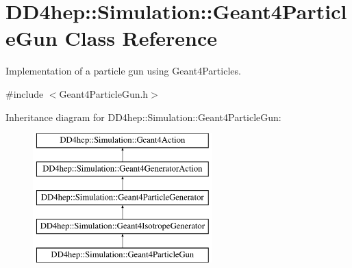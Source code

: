 \hypertarget{class_d_d4hep_1_1_simulation_1_1_geant4_particle_gun}{}\section{D\+D4hep\+:\+:Simulation\+:\+:Geant4\+Particle\+Gun Class Reference}
\label{class_d_d4hep_1_1_simulation_1_1_geant4_particle_gun}


Implementation of a particle gun using Geant4\+Particles.  




{\ttfamily \#include $<$Geant4\+Particle\+Gun.\+h$>$}

Inheritance diagram for D\+D4hep\+:\+:Simulation\+:\+:Geant4\+Particle\+Gun\+:\begin{figure}[H]
\begin{center}
\leavevmode
\includegraphics[height=5.000000cm]{class_d_d4hep_1_1_simulation_1_1_geant4_particle_gun}
\end{center}
\end{figure}
